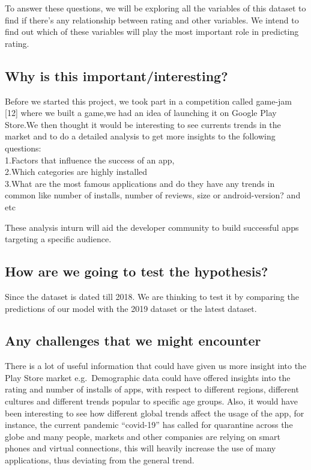 \documentclass[
]{article}
\begin{document}
To answer these questions, we will be exploring all the variables of
this dataset to find if there's any relationship between rating and
other variables. We intend to find out which of these variables will
play the most important role in predicting rating.

\hypertarget{why-is-this-importantinteresting}{%
\subsection{Why is this
important/interesting?}\label{why-is-this-importantinteresting}}

Before we started this project, we took part in a competition called
game-jam {[}12{]} where we built a game,we had an idea of launching it
on Google Play Store.We then thought it would be interesting to see
currents trends in the market and to do a detailed analysis to get more
insights to the following questions:\\
1.Factors that influence the success of an app,\\
2.Which categories are highly installed\\
3.What are the most famous applications and do they have any trends in
common like number of installs, number of reviews, size or
android-version? and etc

These analysis inturn will aid the developer community to build
successful apps targeting a specific audience.

\hypertarget{how-are-we-going-to-test-the-hypothesis}{%
\subsection{How are we going to test the
hypothesis?}\label{how-are-we-going-to-test-the-hypothesis}}

Since the dataset is dated till 2018. We are thinking to test it by
comparing the predictions of our model with the 2019 dataset or the
latest dataset.

\hypertarget{any-challenges-that-we-might-encounter}{%
\subsection{Any challenges that we might
encounter}\label{any-challenges-that-we-might-encounter}}

There is a lot of useful information that could have given us more
insight into the Play Store market e.g.~Demographic data could have
offered insights into the rating and number of installs of apps, with
respect to different regions, different cultures and different trends
popular to specific age groups. Also, it would have been interesting to
see how different global trends affect the usage of the app, for
instance, the current pandemic ``covid-19'' has called for quarantine
across the globe and many people, markets and other companies are
relying on smart phones and virtual connections, this will heavily
increase the use of many applications, thus deviating from the general
trend.
\end{document}
